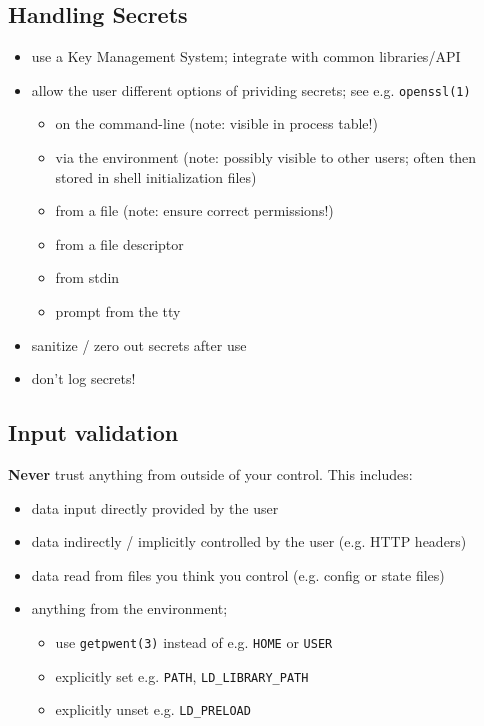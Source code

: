 \documentclass[xga]{xdvislides}
\begin{document}
\subsection{Handling Secrets}
\begin{itemize}
	\item use a Key Management System; integrate
		with common libraries/API
	\item allow the user different options of
		prividing secrets; see e.g. \verb+openssl(1)+
		\begin{itemize}
			\item on the command-line (note:
			visible in process table!)
			\item via the environment (note:
			possibly visible to other users;
			often then stored in shell
			initialization files)
			\item from a file (note: ensure
			correct permissions!)
			\item from a file descriptor
			\item from stdin
			\item prompt from the tty
		\end{itemize}
	\item sanitize / zero out secrets after use
	\item don't log secrets!
\end{itemize}


\subsection{Input validation}

{\bf Never} trust anything from outside of your
control.  This includes:
\begin{itemize}
	\item data input directly provided by the user
	\item data indirectly / implicitly controlled
		by the user (e.g. HTTP headers)
	\item data read from files you think you
		control (e.g. config or state files)
	\item anything from the environment;
		\begin{itemize}
			\item use \verb+getpwent(3)+ instead of e.g. \verb+HOME+ or \verb+USER+
			\item explicitly set e.g. \verb+PATH+, \verb+LD_LIBRARY_PATH+
			\item explicitly unset e.g. \verb+LD_PRELOAD+
		\end{itemize}
\end{itemize}
\end{document}
